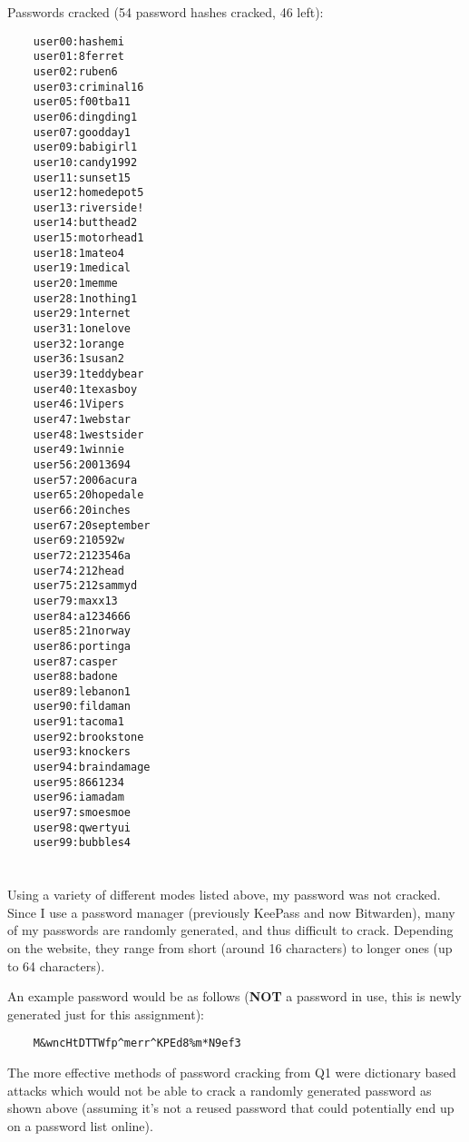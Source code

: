 \documentclass[12pt]{exam}
\begin{document}
\noindent
Passwords cracked (54 password hashes cracked, 46 left):
\begin{multicols}{3}
    \begin{lstlisting}
    user00:hashemi
    user01:8ferret
    user02:ruben6
    user03:criminal16
    user05:f00tba11
    user06:dingding1
    user07:goodday1
    user09:babigirl1
    user10:candy1992
    user11:sunset15
    user12:homedepot5
    user13:riverside!
    user14:butthead2
    user15:motorhead1
    user18:1mateo4
    user19:1medical
    user20:1memme
    user28:1nothing1
    user29:1nternet
    user31:1onelove
    user32:1orange
    user36:1susan2
    user39:1teddybear
    user40:1texasboy
    user46:1Vipers
    user47:1webstar
    user48:1westsider
    user49:1winnie
    user56:20013694
    user57:2006acura
    user65:20hopedale
    user66:20inches
    user67:20september
    user69:210592w
    user72:2123546a
    user74:212head
    user75:212sammyd
    user79:maxx13
    user84:a1234666
    user85:21norway
    user86:portinga
    user87:casper
    user88:badone
    user89:lebanon1
    user90:fildaman
    user91:tacoma1
    user92:brookstone
    user93:knockers
    user94:braindamage
    user95:8661234
    user96:iamadam
    user97:smoesmoe
    user98:qwertyui
    user99:bubbles4
    \end{lstlisting}
\end{multicols}

\newpage

\section{}

Using a variety of different modes listed above, my password was not cracked.
Since I use a password manager (previously KeePass and now Bitwarden), many of
my passwords are randomly generated, and thus difficult to crack.  Depending on
the website, they range from short (around 16 characters) to longer ones (up to
64 characters).

An example password would be as follows (\textbf{NOT} a password in use, this is newly
generated just for this assignment):

\begin{lstlisting}
    M&wncHtDTTWfp^merr^KPEd8%m*N9ef3
\end{lstlisting}

The more effective methods of password cracking from Q1 were dictionary based
attacks which would not be able to crack a randomly generated password as shown
above (assuming it’s not a reused password that could potentially end up on a
password list online).
\end{document}
